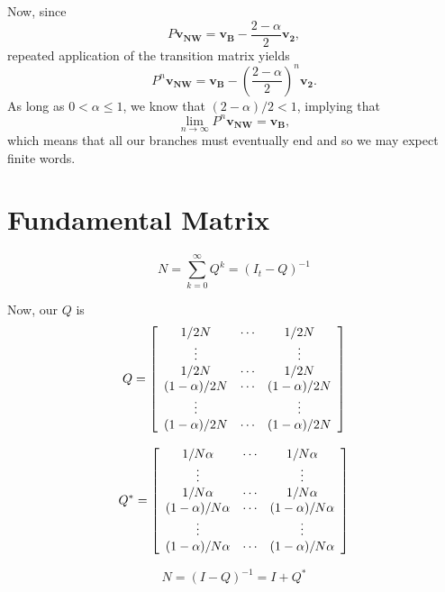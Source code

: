 \documentclass[11pt]{article}
\begin{document}
Now, since
\begin{equation}
P\mathbf{v_{NW}} = \mathbf{v_B} -  \frac{2-\alpha}{2}\mathbf{v_2},
\end{equation}
repeated application of the transition matrix yields
\begin{equation}
P^n\mathbf{v_{NW}} = \mathbf{v_B} -  \left(\frac{2-\alpha}{2}\right)^n\mathbf{v_2}.
\end{equation}
As long as $0<\alpha\le1$, we know that $(2-\alpha)/2<1$, implying that
\begin{equation}
\lim_{n\to\infty}P^n\mathbf{v_{NW}} = \mathbf{v_B},
\end{equation}
which means that all our branches must eventually end and so we may expect finite words.


\section{Fundamental Matrix}
\begin{equation}
N = \sum_{k=0}^\infty Q^k = (I_t - Q)^{-1}
\end{equation}

Now, our $Q$ is
\begin{equation}
Q = \left[\begin{array}{c c c}
1/2N& \cdots& 1/2N\\
\vdots & &\vdots\\
1/2N& \cdots& 1/2N\\
(1-\alpha)/2N& \cdots& (1-\alpha)/2N\\
\vdots & &\vdots\\
(1-\alpha)/2N& \cdots& (1-\alpha)/2N
\end{array}\right]
\end{equation}

\begin{equation}
Q^* = \left[\begin{array}{c c c}
1/N\alpha& \cdots& 1/N\alpha\\
\vdots & &\vdots\\
1/N\alpha& \cdots& 1/N\alpha\\
(1-\alpha)/N\alpha& \cdots& (1-\alpha)/N\alpha\\
\vdots & &\vdots\\
(1-\alpha)/N\alpha& \cdots& (1-\alpha)/N\alpha
\end{array}\right]
\end{equation}

\begin{equation}
N = (I - Q)^{-1} = I + Q^*
\end{equation}
\end{document}
